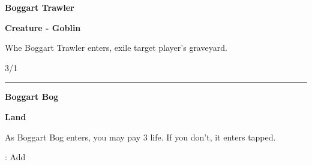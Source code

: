 \documentclass[8pt]{extarticle}
\begin{document}
{\large\textbf{Boggart Trawler}}
\hfill
\2\B

\textbf{Creature - Goblin}

Whe Boggart Trawler enters, exile target player's graveyard.

\hfill 3/1

\vfill
\hrule
\vfill

{\large\textbf{Boggart Bog}}

\textbf{Land}

As Boggart Bog enters, you may pay 3 life. If you don’t, it enters tapped.

\T: Add \B
\end{document}
